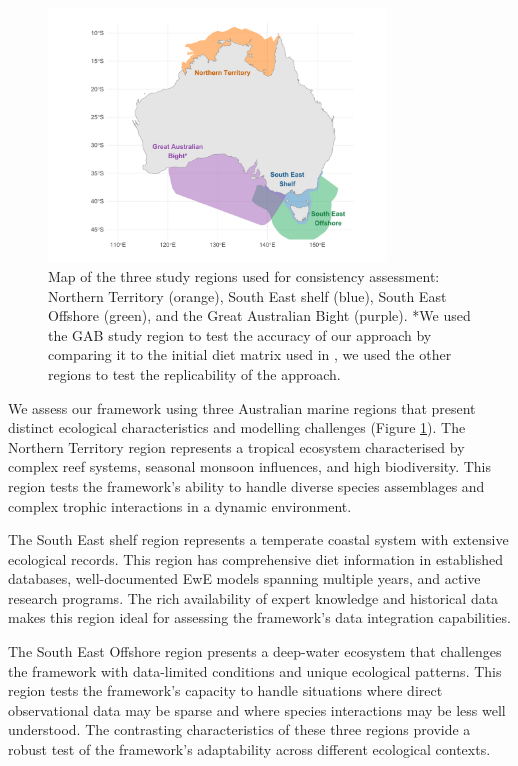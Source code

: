 \begin{figure}[htbp]
    \centering
    \includegraphics[width=0.8\textwidth]{figures/validation_regions.pdf}
    \caption{Map of the three study regions used for consistency assessment: Northern Territory (orange), South East shelf (blue), South East Offshore (green), and the Great Australian Bight (purple). *We used the GAB study region to test the accuracy of our approach by comparing it to the initial diet matrix used in \citep{Fulton2018}, we used the other regions to test the replicability of the approach.}
    \label{fig:validation_regions}
    \end{figure}

We assess our framework using three Australian marine regions that present distinct ecological characteristics and modelling challenges (Figure \ref{fig:validation_regions}). The Northern Territory region represents a tropical ecosystem characterised by complex reef systems, seasonal monsoon influences, and high biodiversity. This region tests the framework's ability to handle diverse species assemblages and complex trophic interactions in a dynamic environment.

The South East shelf region represents a temperate coastal system with extensive ecological records. This region has comprehensive diet information in established databases, well-documented EwE models spanning multiple years, and active research programs. The rich availability of expert knowledge and historical data makes this region ideal for assessing the framework's data integration capabilities.

The South East Offshore region presents a deep-water ecosystem that challenges the framework with data-limited conditions and unique ecological patterns. This region tests the framework's capacity to handle situations where direct observational data may be sparse and where species interactions may be less well understood. The contrasting characteristics of these three regions provide a robust test of the framework's adaptability across different ecological contexts.

